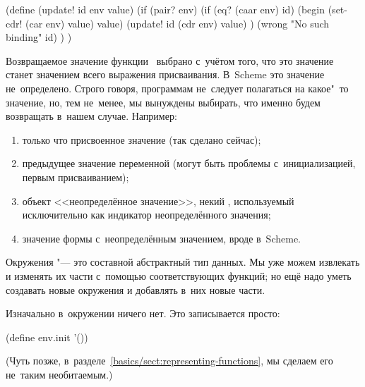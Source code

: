 \begin{code:lisp}
(define (update! id env value)
  (if (pair? env)
      (if (eq? (caar env) id)
          (begin (set-cdr! (car env) value)
                 value)
          (update! id (cdr env) value) )
      (wrong "No such binding" id) ) )
\end{code:lisp}


Возвращаемое значение функции~ выбрано с~учётом того, что это
значение станет значением всего выражения присваивания. В~Scheme это значение
не~определено. Строго говоря, программам не~следует полагаться на какое"~то
значение, но, тем не~менее, мы вынуждены выбирать, что именно будем возвращать
в~нашем случае. Например:

\begin{enumerate}
  \item только что присвоенное значение (так сделано сейчас);

  \item предыдущее значение переменной (могут быть проблемы
        с~инициализацией, первым присваиванием);

  \item {}\label{basics/s:env/ufo}
        объект <<неопределённое значение>>, некий ,
        используемый исключительно как индикатор неопределённого
        значения;

  \item значение формы с~неопределённым значением, вроде
         в~Scheme.
\end{enumerate}

Окружения "--- это составной абстрактный тип данных. Мы уже можем извлекать и
изменять их части с~помощью соответствующих функций; но ещё надо уметь
создавать новые окружения и добавлять в~них новые части.

Изначально в~окружении ничего нет. Это записывается просто:

\begin{code:lisp}
(define env.init '())
\end{code:lisp}

(Чуть позже, в~разделе~\ref{basics/sect:representing-functions}, мы сделаем его
не~таким необитаемым.)

